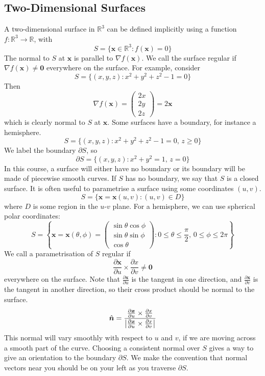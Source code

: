 \documentclass{article}
\begin{document}
\subsection{Two-Dimensional Surfaces}
A two-dimensional surface in $\mathbb R^3$ can be defined implicitly using a function $f \colon \mathbb R^3 \to \mathbb R$, with
\[ S = \{ \bm x \in \mathbb R^3 \colon f(\bm x) = 0 \} \]
The normal to $S$ at $\bm x$ is parallel to $\nabla f(\bm x)$. We call the surface regular if $\nabla f(\bm x) \neq \bm 0$ everywhere on the surface. For example, consider
\[ S = \{ (x, y, z) \colon x^2 + y^2 + z^2 - 1 = 0 \} \]
Then
\[ \nabla f(\bm x) = \begin{pmatrix}
        2x \\ 2y \\ 2z
    \end{pmatrix} = 2\bm x \]
which is clearly normal to $S$ at $\bm x$. Some surfaces have a boundary, for instance a hemisphere.
\[ S = \{ (x, y, z) \colon x^2 + y^2 + z^2 - 1 = 0,\,z \geq 0 \} \]
We label the boundary $\partial S$, so
\[ \partial S = \{ (x, y, z) \colon x^2 + y^2 = 1,\,z = 0 \} \]
In this course, a surface will either have no boundary or its boundary will be made of piecewise smooth curves. If $S$ has no boundary, we say that $S$ is a closed surface. It is often useful to parametrise a surface using some coordinates $(u, v)$.
\[ S = \{ \bm x = \bm x(u, v) \colon (u, v) \in D \} \]
where $D$ is some region in the $u$-$v$ plane. For a hemisphere, we can use spherical polar coordinates:
\[ S = \left\{ \bm x = \bm x(\theta, \phi) = \begin{pmatrix}
        \sin\theta \cos\phi \\ \sin\theta \sin\phi \\ \cos\theta
    \end{pmatrix} \colon 0 \leq \theta \leq \frac{\pi}{2},\, 0 \leq \phi \leq 2\pi \right\} \]
We call a parametrisation of $S$ regular if
\[ \frac{\partial \bm x}{\partial u} \times \frac{\partial x}{\partial v} \neq \bm 0 \]
everywhere on the surface. Note that $\frac{\partial \bm x}{\partial u}$ is the tangent in one direction, and $\frac{\partial \bm x}{\partial v}$ is the tangent in another direction, so their cross product should be normal to the surface.
\[ \hat{\bm n} = \frac{\frac{\partial \bm x}{\partial u} \times \frac{\partial x}{\partial v}}{\abs{\frac{\partial \bm x}{\partial u} \times \frac{\partial x}{\partial v}}} \]
This normal will vary smoothly with respect to $u$ and $v$, if we are moving across a smooth part of the curve. Choosing a consistent normal over $S$ gives a way to give an orientation to the boundary $\partial S$. We make the convention that normal vectors near you should be on your left as you traverse $\partial S$.
\end{document}

